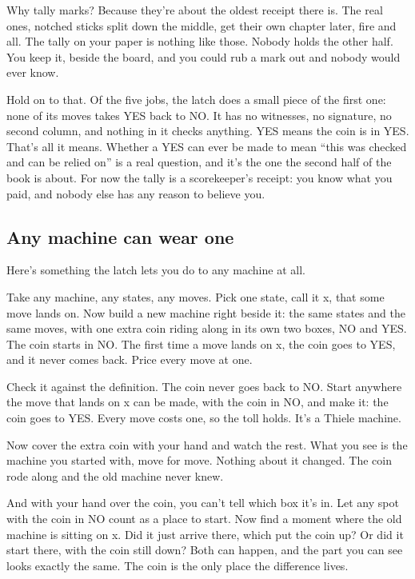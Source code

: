 \documentclass[11pt,twoside]{article}
\theoremstyle{thielethm}
\theoremstyle{thieledef}
\theoremstyle{thieledef}
\theoremstyle{thieledef}
\theoremstyle{thielethm}
\theoremstyle{thieleobs}
\theoremstyle{thielethm}
\begin{document}
Why tally marks? Because they're about the oldest receipt there is. The real ones, notched sticks split down the middle, get their own chapter later, fire and all. The tally on your paper is nothing like those. Nobody holds the other half. You keep it, beside the board, and you could rub a mark out and nobody would ever know.

Hold on to that. Of the five jobs, the latch does a small piece of the first one: none of its moves takes YES back to NO. It has no witnesses, no signature, no second column, and nothing in it checks anything. YES means the coin is in YES. That's all it means. Whether a YES can ever be made to mean ``this was checked and can be relied on'' is a real question, and it's the one the second half of the book is about. For now the tally is a scorekeeper's receipt: you know what you paid, and nobody else has any reason to believe you.

\subsection{Any machine can wear one}

Here's something the latch lets you do to any machine at all.

Take any machine, any states, any moves. Pick one state, call it x, that some move lands on. Now build a new machine right beside it: the same states and the same moves, with one extra coin riding along in its own two boxes, NO and YES. The coin starts in NO. The first time a move lands on x, the coin goes to YES, and it never comes back. Price every move at one.

Check it against the definition. The coin never goes back to NO. Start anywhere the move that lands on x can be made, with the coin in NO, and make it: the coin goes to YES. Every move costs one, so the toll holds. It's a Thiele machine.

Now cover the extra coin with your hand and watch the rest. What you see is the machine you started with, move for move. Nothing about it changed. The coin rode along and the old machine never knew.

And with your hand over the coin, you can't tell which box it's in. Let any spot with the coin in NO count as a place to start. Now find a moment where the old machine is sitting on x. Did it just arrive there, which put the coin up? Or did it start there, with the coin still down? Both can happen, and the part you can see looks exactly the same. The coin is the only place the difference lives.
\end{document}
